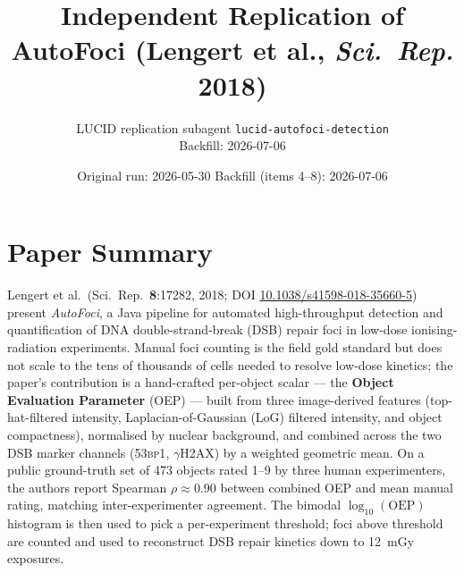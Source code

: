 \documentclass[11pt]{article}
\title{Independent Replication of AutoFoci (Lengert et al., \emph{Sci.\ Rep.} 2018)}
\author{LUCID replication subagent \texttt{lucid-autofoci-detection}\\
Backfill: 2026-07-06}
\date{Original run: 2026-05-30 \quad Backfill (items 4--8): 2026-07-06}
\begin{document}
\maketitle

\section{Paper Summary}
Lengert et al.\ (Sci.\ Rep.\ \textbf{8}:17282, 2018; DOI \href{https://doi.org/10.1038/s41598-018-35660-5}{10.1038/s41598-018-35660-5}) present \emph{AutoFoci}, a Java pipeline for automated high-throughput detection and quantification of DNA double-strand-break (DSB) repair foci in low-dose ionising-radiation experiments. Manual foci counting is the field gold standard but does not scale to the tens of thousands of cells needed to resolve low-dose kinetics; the paper's contribution is a hand-crafted per-object scalar --- the \textbf{Object Evaluation Parameter} (OEP) --- built from three image-derived features (top-hat-filtered intensity, Laplacian-of-Gaussian (LoG) filtered intensity, and object compactness), normalised by nuclear background, and combined across the two DSB marker channels (\textsc{53bp1}, $\gamma$H2AX) by a weighted geometric mean. On a public ground-truth set of 473 objects rated 1--9 by three human experimenters, the authors report Spearman $\rho \approx 0.90$ between combined OEP and mean manual rating, matching inter-experimenter agreement. The bimodal $\log_{10}(\mathrm{OEP})$ histogram is then used to pick a per-experiment threshold; foci above threshold are counted and used to reconstruct DSB repair kinetics down to 12~mGy exposures.
\end{document}
